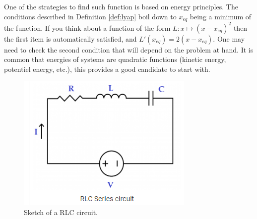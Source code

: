 One of the strategies to find such function is based on energy principles. The conditions described in Definition \ref{def:lyap} boil down to $x_{eq}$ being a minimum of the function. If you think about a function of the form $L : x \mapsto (x-x_{eq})^2$ then the first item is automatically satisfied, and $L'(x_{eq}) = 2 (x - x_{eq})$. One may need to check the second condition that will depend on the problem at hand. It is common that energies of systems are quadratic functions (kinetic energy, potentiel energy, etc.), this provides a good candidate to start with.
 \begin{figure}[H]
  \centering
  \includegraphics[width=0.4\linewidth]{img/rlc-circuits-in-series.png}
  \caption{Sketch of a RLC circuit.}
  \label{fig:RLC}
 \end{figure}
